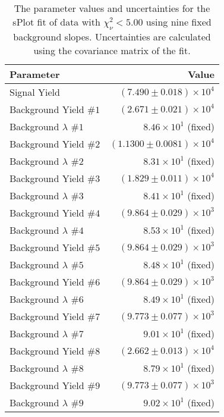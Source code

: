 
\begin{table}[ht]
    \begin{center}
        \begin{tabular}{lr}\toprule
            Parameter & Value \\\midrule
            Signal Yield & $(7.490 \pm 0.018) \times 10^{4}$ \\
            Background Yield $\#1$ & $(2.671 \pm 0.021) \times 10^{4}$ \\
            Background $\lambda$ $\#1$ & $8.46 \times 10^{1}$ (fixed) \\
            Background Yield $\#2$ & $(1.1300 \pm 0.0081) \times 10^{4}$ \\
            Background $\lambda$ $\#2$ & $8.31 \times 10^{1}$ (fixed) \\
            Background Yield $\#3$ & $(1.829 \pm 0.011) \times 10^{4}$ \\
            Background $\lambda$ $\#3$ & $8.41 \times 10^{1}$ (fixed) \\
            Background Yield $\#4$ & $(9.864 \pm 0.029) \times 10^{3}$ \\
            Background $\lambda$ $\#4$ & $8.53 \times 10^{1}$ (fixed) \\
            Background Yield $\#5$ & $(9.864 \pm 0.029) \times 10^{3}$ \\
            Background $\lambda$ $\#5$ & $8.48 \times 10^{1}$ (fixed) \\
            Background Yield $\#6$ & $(9.864 \pm 0.029) \times 10^{3}$ \\
            Background $\lambda$ $\#6$ & $8.49 \times 10^{1}$ (fixed) \\
            Background Yield $\#7$ & $(9.773 \pm 0.077) \times 10^{3}$ \\
            Background $\lambda$ $\#7$ & $9.01 \times 10^{1}$ (fixed) \\
            Background Yield $\#8$ & $(2.662 \pm 0.013) \times 10^{4}$ \\
            Background $\lambda$ $\#8$ & $8.79 \times 10^{1}$ (fixed) \\
            Background Yield $\#9$ & $(9.773 \pm 0.077) \times 10^{3}$ \\
            Background $\lambda$ $\#9$ & $9.02 \times 10^{1}$ (fixed) \\\bottomrule
        \end{tabular}
        \caption{The parameter values and uncertainties for the sPlot fit of data with $\chi^2_\nu < 5.00$ using nine fixed background slopes. Uncertainties are calculated using the covariance matrix of the fit.}\label{tab:splot-fit-results-chisqdof-5.00-fixed-9}
    \end{center}
\end{table}
